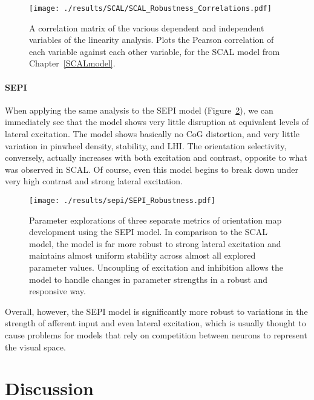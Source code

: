 \begin{figure}
	\centering
    \texttt{[image: ./results/SCAL/SCAL\_Robustness\_Correlations.pdf]}
	\caption{A correlation matrix of the various dependent and
      independent variables of the linearity analysis. Plots the
      Pearson correlation of each variable against each other
      variable, for the SCAL model from Chapter~\ref{SCALmodel}.}
	\label{SCALRobustnessCorr}
\end{figure}

\paragraph{SEPI}

When applying the same analysis to the SEPI model
(Figure~\ref{SEPIStability}), we can immediately see that the model
shows very little disruption at equivalent levels of lateral
excitation.  The model shows basically no CoG distortion, and very
little variation in pinwheel density, stability, and LHI. The
orientation selectivity, conversely, actually increases with both
excitation and contrast, opposite to what was observed in SCAL. Of
course, even this model begins to break down under very high contrast
and strong lateral excitation.

\begin{figure}
	\centering
        \texttt{[image: ./results/sepi/SEPI\_Robustness.pdf]}
	\caption{Parameter explorations of three separate metrics of
          orientation map development using the SEPI model. In
          comparison to the SCAL model, the model is far more
          robust to strong lateral excitation and maintains almost
          uniform stability across almost all explored parameter
          values. Uncoupling of excitation and inhibition allows the
          model to handle changes in parameter strengths in a robust
          and responsive way.}
	\label{SEPIStability}
\end{figure}

Overall, however, the SEPI model is significantly more robust to
variations in the strength of afferent input and even lateral
excitation, which is usually thought to cause problems for models
that rely on competition between neurons to represent the visual
space.

\section{Discussion}

